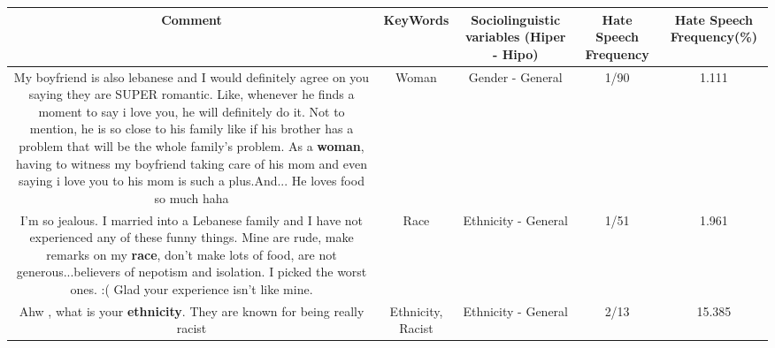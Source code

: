 \documentclass[11pt]{article}
\newlength\mylength
\begin{document}
\begin{center}
\setlength\mylength{\dimexpr\textwidth - 1\arrayrulewidth - 50\tabcolsep}
\begin{longtable}{|C{.65\mylength}|C{.30\mylength}|C{.12\mylength}|C{.12\mylength}|C{.12\mylength}|}
\hline
\textbf{Comment} & \textbf{KeyWords} & \textbf{Sociolinguistic variables (Hiper - Hipo)}  & \textbf{Hate Speech Frequency} & \textbf{Hate Speech Frequency(\%)} \\
\hline{}\small My boyfriend is also lebanese and I would definitely agree on you saying they are SUPER romantic. Like, whenever he finds a moment to say i love you, he will definitely do it. Not to mention, he is so close to his family like if his brother has a problem that will be the whole family's problem. As a \textbf{woman}, having to witness my boyfriend taking care of his mom and even saying i love you to his mom is such a plus.And... He loves food so much haha\normalsize   & Woman & Gender - General & 1/90 & 1.111 \\  \hline
  \small I'm so jealous. I married into a Lebanese family and I have not experienced any of these funny things. Mine are rude, make remarks on my \textbf{race}, don't make lots of food, are not generous...believers of nepotism and isolation. I picked the worst ones. :( Glad your experience isn't like mine.\normalsize   & Race & Ethnicity - General & 1/51 & 1.961 \\  \hline
  \small Ahw , what is your \textbf{ethnicity}. They are known for being really racist\normalsize   & Ethnicity, Racist & Ethnicity - General & 2/13 & 15.385 \\  \hline

\end{longtable}
\end{center}
\end{document}
